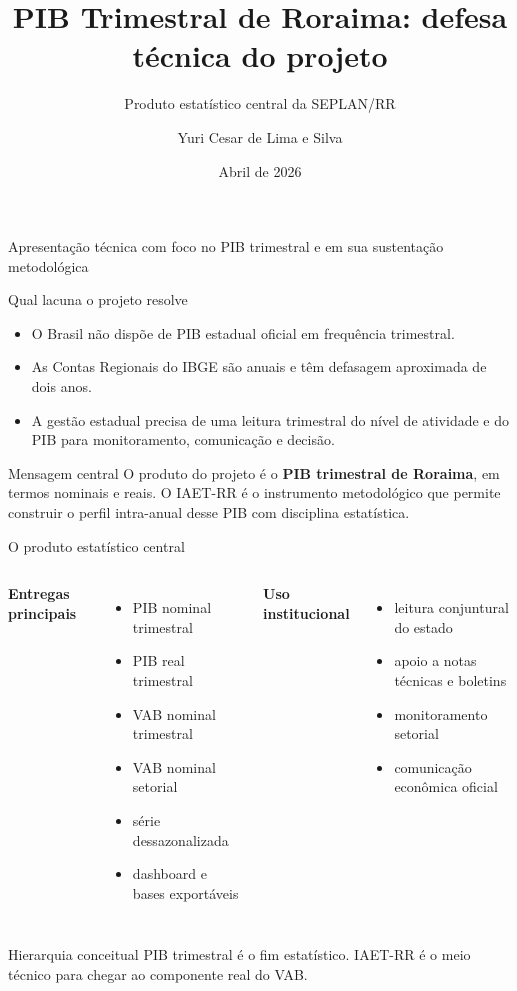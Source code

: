 \documentclass[aspectratio=169,11pt]{beamer}
\title[PIB Trimestral de Roraima]{PIB Trimestral de Roraima: defesa técnica do projeto}
\subtitle{Produto estatístico central da SEPLAN/RR}
\author{Yuri Cesar de Lima e Silva}
\institute{SEPLAN/RR -- CGEES/DIEAS}
\date{Abril de 2026}
\begin{document}
\begin{frame}[plain]
  \titlepage
  \vspace{-0.4cm}
  \begin{center}
    \small Apresentação técnica com foco no PIB trimestral e em sua sustentação metodológica
  \end{center}
\end{frame}

\begin{frame}{Qual lacuna o projeto resolve}
\begin{itemize}
  \item O Brasil não dispõe de PIB estadual oficial em frequência trimestral.
  \item As Contas Regionais do IBGE são anuais e têm defasagem aproximada de dois anos.
  \item A gestão estadual precisa de uma leitura trimestral do nível de atividade e do PIB para monitoramento, comunicação e decisão.
\end{itemize}

\vspace{0.3cm}
\begin{block}{Mensagem central}
O produto do projeto é o \textbf{PIB trimestral de Roraima}, em termos nominais e reais. O IAET-RR é o instrumento metodológico que permite construir o perfil intra-anual desse PIB com disciplina estatística.
\end{block}
\end{frame}

\begin{frame}{O produto estatístico central}
\begin{columns}[T]
\textbf{Entregas principais}
\begin{itemize}
  \item PIB nominal trimestral
  \item PIB real trimestral
  \item VAB nominal trimestral
  \item VAB nominal setorial
  \item série dessazonalizada
  \item dashboard e bases exportáveis
\end{itemize}

\textbf{Uso institucional}
\begin{itemize}
  \item leitura conjuntural do estado
  \item apoio a notas técnicas e boletins
  \item monitoramento setorial
  \item comunicação econômica oficial
\end{itemize}
\end{columns}

\vspace{0.2cm}
\begin{alertblock}{Hierarquia conceitual}
PIB trimestral é o fim estatístico. IAET-RR é o meio técnico para chegar ao componente real do VAB.
\end{alertblock}
\end{frame}
\end{document}
